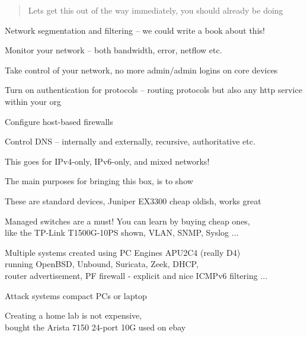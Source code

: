 \documentclass[Screen16to9,17pt]{foils}
\begin{document}


\begin{quote}
Lets get this out of the way immediately, you should already be doing
\end{quote}

\begin{list2}
\item Network segmentation and filtering -- we could write a book about this! {\myalert}
\item Monitor your network -- both bandwidth, error, netflow etc. {\myalert}
\item Take control of your network, no more admin/admin logins on core devices {\myalert}
\item Turn on authentication for protocols -- routing protocols but also any http service within your org {\myalert}
\item Configure host-based firewalls {\myalert}
\item Control DNS -- internally and externally, recursive, authoritative etc. {\myalert}
\end{list2}

\centerline{This goes for IPv4-only, IPv6-only, and mixed networks!}



The main purposes for bringing this box, is to show
\begin{list2}
\item These are standard devices, Juniper EX3300 cheap oldish, works great
\item Managed switches are a must! You can learn by buying cheap ones,\\
like the TP-Link T1500G-10PS  shown, VLAN, SNMP, Syslog ...
\item Multiple systems created using PC Engines APU2C4 (really D4)\\
running OpenBSD, Unbound, Suricata, Zeek, DHCP, \\
router advertisement, PF firewall - explicit and nice ICMPv6 filtering ...
\item Attack systems compact PCs or laptop
\item Creating a home lab is not expensive, \\
bought the Arista 7150 24-port 10G used on ebay
\end{list2}
\end{document}
